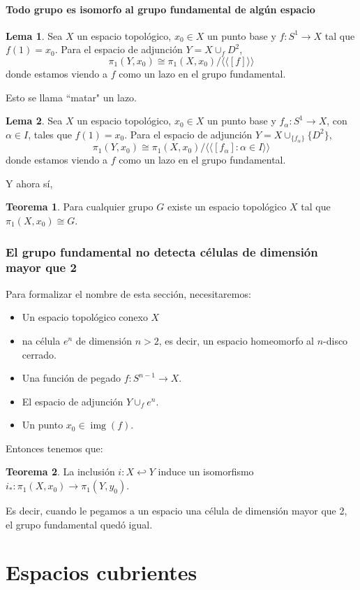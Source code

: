 \documentclass[spanish]{book}
\theoremstyle{definition}
\newtheorem*{lema}{Lema}
\newtheorem*{teo}{Teorema}
\DeclareMathOperator{\img}{img}
\begin{document}
\subsection{Todo grupo es isomorfo al grupo fundamental de algún espacio}
	\begin{lema}
		Sea $X$ un espacio topológico, $x_0\in X$ un punto base y $f:S^1\to X$ tal que $f(1)=x_0$. Para el espacio de adjunción $Y=X\cup_f D^2$,
		\[\pi_1(Y,x_0)\cong\pi_1(X,x_0)\big/\langle\langle [f]\rangle\rangle\]
		donde estamos viendo a $f$ como un lazo en el grupo fundamental.
	\end{lema}
	Esto se llama ``matar" un lazo.
	\begin{lema}
		Sea $X$ un espacio topológico, $x_0\in X$ un punto base y $f_\alpha:S^1\to X$, con $\alpha\in I$, tales que $f(1)=x_0$. Para el espacio de adjunción $Y=X\cup_{\{f_\alpha\}} \{D^2\}$,
		\[\pi_1(Y,x_0)\cong\pi_1(X,x_0)\big/\langle\langle [f_\alpha]:\alpha\in I\rangle\rangle\]
		donde estamos viendo a $f$ como un lazo en el grupo fundamental.
	\end{lema}
	Y ahora sí,
	\begin{teo}
		Para cualquier grupo $G$ existe un espacio topológico $X$ tal que $\pi_1(X,x_0)\cong G$.
	\end{teo}
	
\section{El grupo fundamental no detecta células de dimensión mayor que 2}
	Para formalizar el nombre de esta sección, necesitaremos: 
	\begin{itemize}
		\item Un espacio topológico conexo $X$
		\item na célula $e^n$ de dimensión $n>2$, es decir, un espacio homeomorfo al $n$-disco cerrado.
		\item Una función de pegado $f:S^{n-1}\to X$.
		\item El espacio de adjunción $Y\cup_f e^n$.
		\item Un punto $x_0\in\img(f)$.
	\end{itemize}
	Entonces tenemos que:
	\begin{teo}
		La inclusión $i:X\hookleftarrow Y$ induce un isomorfismo $i_*:\pi_1(X,x_0)\to\pi_1(Y,y_0)$.
	\end{teo}
	Es decir, cuando le pegamos a un espacio una célula de dimensión mayor que 2, el grupo fundamental quedó igual.
\part{Espacios cubrientes}
\end{document}
